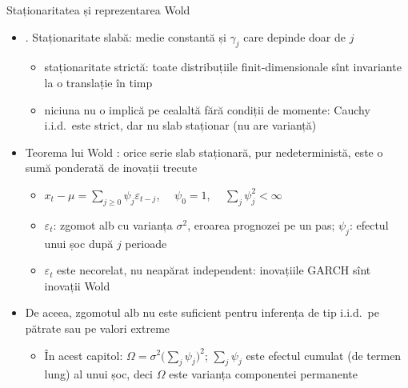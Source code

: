 \begin{frame}{Staționaritatea și reprezentarea Wold}
\itemsize{\small}
\begin{itemize}
    \item {}. Staționaritate slabă: medie constantă și $\gamma_j$ care depinde doar de $j$
    \begin{itemize}
        \item staționaritate strictă: toate distribuțiile finit-dimensionale sînt invariante la o translație în timp
        \item niciuna nu o implică pe cealaltă fără condiții de momente: Cauchy i.i.d.\ este strict, dar nu slab staționar (nu are varianță)
    \end{itemize}
    \item Teorema lui Wold : orice serie slab staționară, pur nedeterministă, este o sumă ponderată de inovații trecute
    \begin{itemize}
        \item $x_t - \mu = \sum_{j\ge 0}\psi_j\varepsilon_{t-j}$, $\quad \psi_0 = 1$, $\quad \sum_j\psi_j^2 < \infty$
        \item $\varepsilon_t$: zgomot alb cu varianța $\sigma^2$, eroarea prognozei pe un pas; $\psi_j$: efectul unui șoc după $j$ perioade
        \item $\varepsilon_t$ este necorelat, nu neapărat independent: inovațiile GARCH sînt inovații Wold
    \end{itemize}
    \item De aceea, zgomotul alb nu este suficient pentru inferența de tip i.i.d.\ pe pătrate sau pe valori extreme
    \begin{itemize}
        \item În acest capitol: $\Omega = \sigma^2 \big(\sum_j \psi_j\big)^2$; $\sum_j\psi_j$ este efectul cumulat (de termen lung) al unui șoc, deci $\Omega$ este varianța componentei permanente
    \end{itemize}
\end{itemize}
\end{frame}

